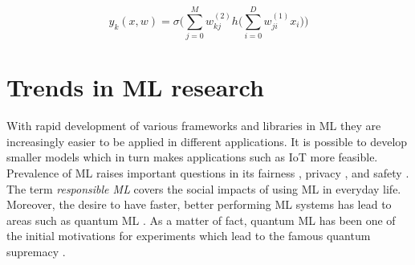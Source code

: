\[
y_{k}(x,w)=\sigma\bigg(\sum_{j=0}^{M}w^{(2)}_{kj}h \bigg( \sum_{i=0}^{D}w_{ji}^{(1)}x_i \bigg)\bigg)
\]


\section{Trends in ML research}
With rapid development of various frameworks and libraries in ML they are increasingly easier to be applied in different applications. It is possible to develop smaller models which in turn makes applications such as IoT \cite{iot_apps_conf} more feasible. 
Prevalence of ML raises important questions in its fairness \cite{FairML2018}, privacy \cite{Federated2019}, and safety \cite{Varshney2017}. The term \textit{responsible ML} covers the social impacts of using ML in everyday life.
Moreover, the desire to have faster, better performing ML systems has lead to areas such as quantum ML \cite{QuantumML2017}. As a matter of fact, quantum ML has been one of the initial motivations for experiments which lead to the famous quantum supremacy \cite{Quantum_sup}.